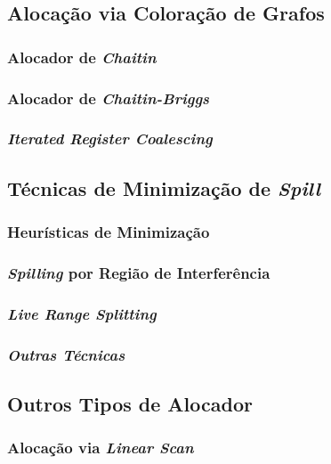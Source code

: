 \documentclass[
	12pt,				%
	openright,			%
	oneside,			%
	a4paper,			%
	tccpreliminar,			%
	]{ABNT-DC-UEL}
\begin{document}
\subsection{Alocação via Coloração de Grafos}

\subsubsection{Alocador de \textit{Chaitin}}

\subsubsection{Alocador de \textit{Chaitin-Briggs}}

\subsubsection{\textit{Iterated Register Coalescing}}

\subsection{Técnicas de Minimização de \textit{Spill}}

\subsubsection{Heurísticas de Minimização}

\subsubsection{\textit{Spilling} por Região de Interferência}

\subsubsection{\textit{Live Range Splitting}}

\subsubsection{\textit{Outras Técnicas}}

\subsection{Outros Tipos de Alocador}

\subsubsection{Alocação via \textit{Linear Scan}}
\end{document}
